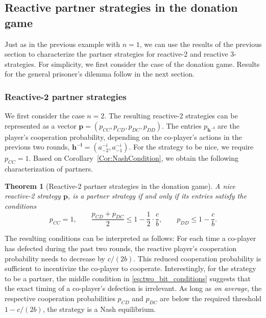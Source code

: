 \documentclass[9pt,twoside,lineno]{pnas-new}
\theoremstyle{plainCl1}
\newtheorem{theorem}{Theorem}
\theoremstyle{plainCl2}
\begin{document}

\subsection{Reactive partner strategies in the donation game}\label{section:reactive_strategies}

Just as in the previous example with $n\!=\!1$, we can use the results of the previous section to characterize the partner strategies for reactive-2 and reactive 3-strategies. 
For simplicity, we first consider the case of the donation game. Results for the general prisoner's dilemma follow in the next section.

\subsubsection*{Reactive-2 partner strategies}
We first consider the case $n\!=\!2$. 
The resulting reactive-2 strategies can be represented as a vector
$\mathbf{p}=(p_{CC}, p_{CD}, p_{DC}, p_{DD})$. 
The entries $p_\mathbf{h^{-i}}$ are the player's cooperation probability, depending on the co-player's actions in the previous two rounds, $\mathbf{h^{-i}}\!=\!(a^{-i}_{-2},a^{-i}_{-1})$. 
For the strategy to be nice, we require $p_{CC}\!=\!1$. 
Based on Corollary~\ref{Cor:NashCondition}, we obtain the following characterization of partners. 

\begin{theorem}[Reactive-2 partner strategies in the donation game]\label{theorem:reactive_two_partner_strategies}
A nice reactive-2 strategy $\mathbf{p}$, is a partner strategy if and only if its entries satisfy the conditions
\begin{equation}\label{eq:two_bit_conditions}
  p_{CC} \!=\! 1, \qquad \displaystyle \frac{p_{CD} \!+\! p_{DC}}{2} \!\le\! 1 \!-\! \frac{1}{2} \cdot \frac{c}{b}, \qquad p_{DD} \le 1\!-\! \frac{c}{b}.
\end{equation}
\end{theorem}

\noindent
The resulting conditions can be interpreted as follows: For each time a co-player has defected during the past two rounds, the reactive player's cooperation probability needs to decrease by $c/(2b)$. 
This reduced cooperation probability is sufficient to incentivize the co-player to cooperate. 
Interestingly, for the strategy to be a partner, the middle condition in \eqref{eq:two_bit_conditions} suggests that the exact timing of a co-player's defection is irrelevant. 
As long as {\it on average}, the respective cooperation probabilities $p_{CD}$ and $p_{DC}$ are below the required threshold $1\!-\!c/(2b)$, the strategy is a Nash equilibrium.\\
\end{document}
